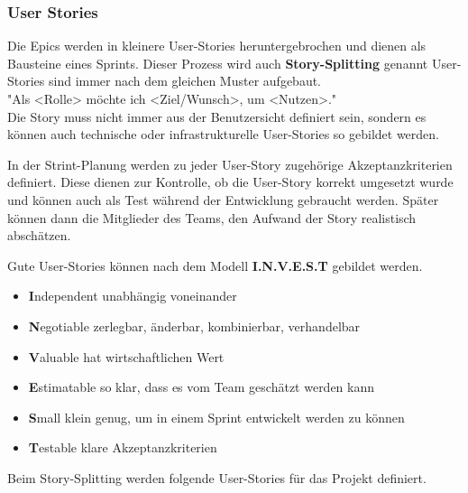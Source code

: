 \documentclass[a4paper, table]{article}
\begin{document}
\subsubsection{User Stories}
Die Epics werden in kleinere User-Stories heruntergebrochen und dienen als Bausteine eines Sprints.
Dieser Prozess wird auch \textbf{Story-Splitting} genannt
User-Stories sind immer nach dem gleichen Muster aufgebaut. \\
"Als <Rolle> möchte ich <Ziel/Wunsch>, um <Nutzen>." \\
Die Story muss nicht immer aus der Benutzersicht definiert sein, sondern es können auch technische oder
infrastrukturelle User-Stories so gebildet werden.

In der Strint-Planung werden zu jeder User-Story zugehörige Akzeptanzkriterien definiert.
Diese dienen zur Kontrolle, ob die User-Story korrekt umgesetzt wurde und
können auch als Test während der Entwicklung gebraucht werden.
Später können dann die Mitglieder des Teams, den Aufwand der Story realistisch abschätzen.

Gute User-Stories können nach dem Modell \textbf{I.N.V.E.S.T} gebildet werden. \autocite{hammerschall_software_2013} %
\begin{itemize}
    \item \textbf{I}ndependent  unabhängig voneinander
    \item \textbf{N}egotiable   zerlegbar, änderbar, kombinierbar, verhandelbar
    \item \textbf{V}aluable     hat wirtschaftlichen Wert
    \item \textbf{E}stimatable  so klar, dass es vom Team geschätzt werden kann
    \item \textbf{S}mall        klein genug, um in einem Sprint entwickelt werden zu können
    \item \textbf{T}estable     klare Akzeptanzkriterien
\end{itemize}

Beim Story-Splitting werden folgende User-Stories für das Projekt definiert.
\end{document}
